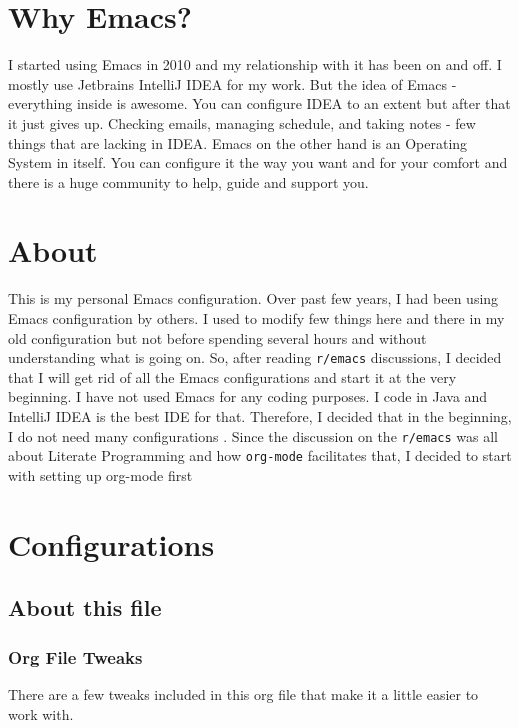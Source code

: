 \documentclass[11pt]{article}
\author{systemhalted}
\date{\today}
\title{}
\begin{document}
\tableofcontents


\section{Why Emacs?}
\label{sec:orgcbd46ca}

I started using Emacs in 2010 and my relationship with it has been on and off. I mostly use Jetbrains IntelliJ IDEA
for my work. But the idea of Emacs - everything inside is awesome. You can configure IDEA to an extent but after that
it just gives up. Checking emails, managing schedule, and taking notes - few things that are lacking in IDEA. Emacs
on the other hand is an Operating System in itself. You can configure it the way you want and for your comfort and
there is a huge community to help, guide and support you.

\section{About}
\label{sec:org0fc2fe8}
This is my personal Emacs configuration. Over past few years, I had been using Emacs configuration by others.
I used to modify few things here and there in my old configuration but not before spending several hours and without
understanding what is going on. So, after reading \texttt{r/emacs} discussions, I decided that I will get rid of all the Emacs
configurations and start it at the very beginning. I have not used Emacs for any coding purposes. I code in Java and
IntelliJ IDEA is the best IDE for that. Therefore, I decided that in the beginning, I do not need many configurations
. Since the discussion on the \texttt{r/emacs} was all about Literate Programming and how \texttt{org-mode} facilitates that, I
decided to start with setting up org-mode first

\section{Configurations}
\label{sec:orgd05655d}
\subsection{About this file}
\label{sec:org00cc1ce}
\subsubsection{Org File Tweaks}
\label{sec:org83f310d}
There are a few tweaks included in this org file that make it a little easier to
work with.
\end{document}
